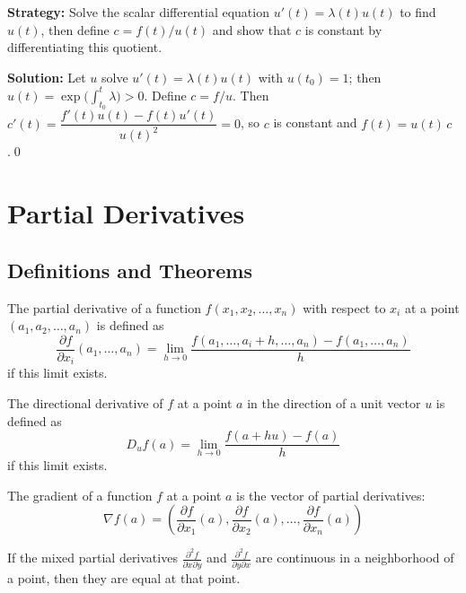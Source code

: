 \noindent\textbf{Strategy:} Solve the scalar differential equation \( u'(t) = \lambda(t)u(t) \) to find \( u(t) \), then define \( c = f(t)/u(t) \) and show that \( c \) is constant by differentiating this quotient.

\bigskip\noindent\textbf{Solution:}
Let $u$ solve $u'(t)=\lambda(t)u(t)$ with $u(t_0)=1$; then $u(t)=\exp\big(\int_{t_0}^t\!\lambda\big)>0$. Define $c=f/u$. Then $c'(t)=\dfrac{f'(t)u(t)-f(t)u'(t)}{u(t)^2}=0$, so $c$ is constant and $f(t)=u(t)\,c$.\qed


\section{Partial Derivatives}

\subsection*{Definitions and Theorems}

\begin{definition}
The partial derivative of a function $f(x_1, x_2, \ldots, x_n)$ with respect to $x_i$ at a point $(a_1, a_2, \ldots, a_n)$ is defined as
\[ \frac{\partial f}{\partial x_i}(a_1, \ldots, a_n) = \lim_{h \to 0} \frac{f(a_1, \ldots, a_i + h, \ldots, a_n) - f(a_1, \ldots, a_n)}{h} \]
if this limit exists.
\end{definition}

\begin{definition}
The directional derivative of $f$ at a point $a$ in the direction of a unit vector $u$ is defined as
\[ D_u f(a) = \lim_{h \to 0} \frac{f(a + hu) - f(a)}{h} \]
if this limit exists.
\end{definition}

\begin{definition}[Gradient]
The gradient of a function $f$ at a point $a$ is the vector of partial derivatives:
\[ \nabla f(a) = \left(\frac{\partial f}{\partial x_1}(a), \frac{\partial f}{\partial x_2}(a), \ldots, \frac{\partial f}{\partial x_n}(a)\right) \]
\end{definition}

\begin{theorem}
If the mixed partial derivatives $\frac{\partial^2 f}{\partial x \partial y}$ and $\frac{\partial^2 f}{\partial y \partial x}$ are continuous in a neighborhood of a point, then they are equal at that point.
\end{theorem}

